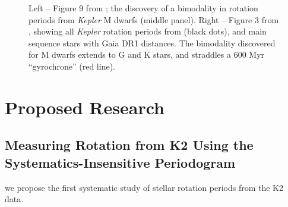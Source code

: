 \documentclass[12pt]{article}
\newcommand{\Kepler}{\textsl{Kepler}\xspace}
\begin{document}
\begin{figure}[!th]
\centering
{}
\caption{
Left -- Figure 9 from \citet{mcquillan2013}; the discovery of a bimodality in rotation periods from \Kepler M dwarfs (middle panel).
Right -- Figure 3 from \citet{davenport2017}, showing all \Kepler rotation periods from \citet{mcquillan2014} (black dots), and main sequence stars with Gaia DR1 distances. The bimodality discovered for M dwarfs extends to G and K stars, and straddles  a 600 Myr ``gyrochrone'' (red line).
}
\label{fig:bimodal}
\end{figure}



\section{Proposed Research}
\subsection{Measuring Rotation from K2 Using the Systematics-Insensitive Periodogram }
we propose the first systematic study of stellar rotation periods from the K2 data.
\end{document}
